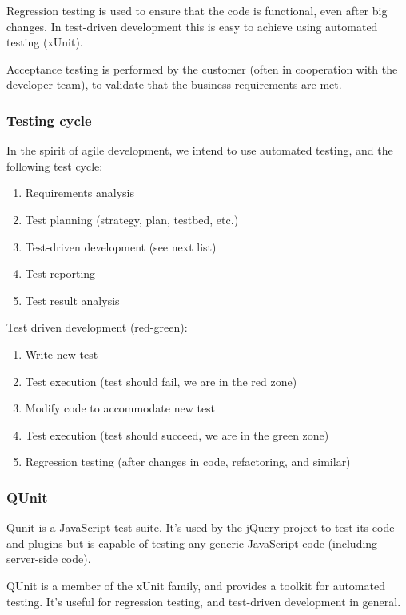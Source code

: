 Regression testing is used to ensure that the code is functional, even after
big changes. In test-driven development this is easy to achieve using automated
testing (xUnit).

Acceptance testing is performed by the customer (often in cooperation with the
developer team), to validate that the business requirements are met.

\subsubsection{Testing cycle}

In the spirit of agile development, we intend to use automated testing, and the
following test cycle:

\begin{enumerate}
	\item Requirements analysis
	\item Test planning (strategy, plan, testbed, etc.)
	\item Test-driven development (see next list)
	\item Test reporting
	\item Test result analysis
\end{enumerate}

Test driven development (red-green):
\begin{enumerate}
	\item Write new test
	\item Test execution (test should fail, we are in the red zone)
	\item Modify code to accommodate new test
	\item Test execution (test should succeed, we are in the green zone)
	\item Regression testing (after changes in code, refactoring, and similar)
\end{enumerate}

\subsubsection{QUnit}
\label{sec:qunit}
	Qunit is a JavaScript test suite. It's used by the jQuery project to test
	its code and plugins but is capable of testing any generic JavaScript code
	(including server-side code). \cite{jquery:qunit}

	QUnit is a member of the xUnit family, and provides a toolkit for automated
	testing. It's useful for regression testing, and test-driven development in
	general.

